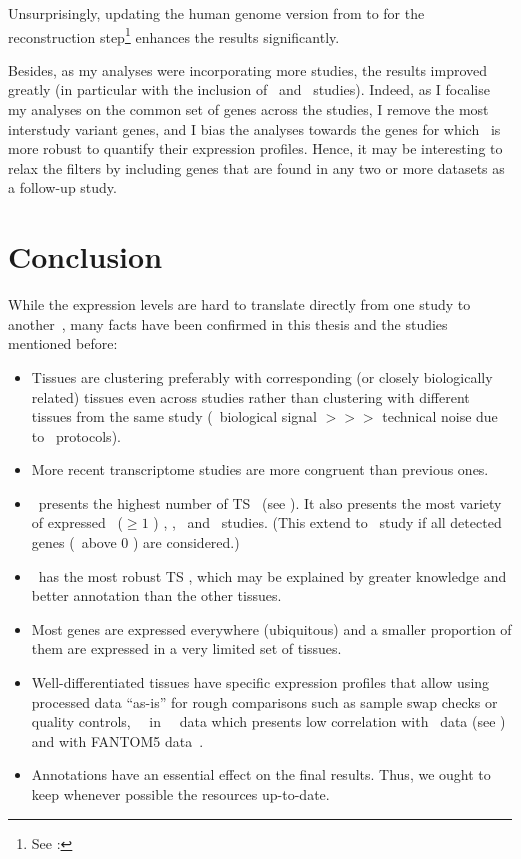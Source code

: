 Unsurprisingly,
updating the human genome version from  to 
for the reconstruction
step\footnote{See : }
enhances the results significantly.

Besides, as my analyses were incorporating more studies,
the results improved greatly
(in particular with the inclusion of \uhlen\ and \gtex\ studies).
Indeed, as I focalise my analyses on the common set of genes across the studies,
I remove the most interstudy variant genes, and
I bias the analyses towards the genes
for which \Rnaseq\ is more robust to quantify their expression profiles.
Hence, it may be interesting to relax the filters by including genes
that are found in any two or more datasets as a follow-up study.


\section{Conclusion}

While the expression levels are hard to translate directly from one study
to another~,
many facts have been confirmed in this thesis and the studies mentioned before:\begin{itemize}[nosep,topsep=0pt]
        \item Tissues are clustering preferably with corresponding
            (or closely biologically related) tissues even across studies
            rather than clustering with different tissues from the same study
            (\ie\ biological signal $>>>$ technical noise due to \Rnaseq\ protocols).
        \item More recent transcriptome studies are more congruent than previous ones.
        \item \testis\ presents the highest number of \gls{TS} \pcgs\
            (see ).
            It also presents the most variety of expressed \pcgs\ ($≥1$ \FPKM)
            \castle, \brawand, \ibm\ and \uhlen\ studies.
            (This extend to \gtex\ study if all detected genes (\ie\ above 0 \FPKM)
            are considered.)
        \item \liver\ has the most robust \gls{TS} \pcgs,
            which may be explained by greater knowledge
            and better annotation than the other tissues.
        \item Most genes are expressed everywhere (ubiquitous) and
          a smaller proportion of them are expressed in a very limited set of tissues.
        \item Well-differentiated tissues have specific expression profiles
            that allow using processed data \enquote{as-is} for rough comparisons
            such as sample swap checks
            or quality controls, \eg\ \salivary\ in \uhlen\ \etal\ data which
            presents low correlation with
            \gtex\ data (see ) and with
            FANTOM5 data~\mycite{Yu2015-uh}.
        \item Annotations have an essential effect on the final results.
              Thus, we ought to keep whenever possible the resources up-to-date.
\end{itemize}

